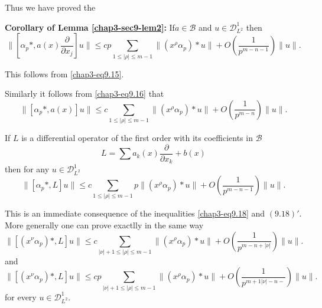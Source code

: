 Thus we have proved the 

\smallskip
\noindent
{\bf Corollary of Lemma \ref{chap3-sec9-lem2}:}
If\pageoriginale $a \in \mathscr{B}$ and $u \in \mathscr{D}^1_{L^2}$ then 
\begin{equation}
\|  [ \alpha_p *, a (x) \frac{\partial}{\partial x_j} ] u \| \le c p
\sum\limits_{1\le|\rho|\le m-1} \| (x^\rho \alpha_p) * u \| + O \left(
\frac{1}{p^{m-n-1}}\right) \| u \|. \tag{9.18} \label{chap3-eq9.18}
\end{equation} 

This follows from \eqref{chap3-eq9.15}.

Similarly it follows from  \eqref{chap3-eq9.16} that 
\begin{equation*}
\|  [ \alpha_p *, a (x)  ] u \| \le c  \sum\limits_{1\le|\rho|\le m-1}
\| (x^\rho \alpha_p) * u \| + O (\frac{1}{p^{m-n}}) \|
u\|. \tag*{$(9.18)'$}  
\end{equation*}

\begin{lemma}\label{chap3-sec9-lem3}%
If $L$ is a differential operator of the first order with its
coefficients in $\mathscr{B}$ 
\begin{equation*}
L = \sum a_k (x) \frac{\partial}{\partial x_k} + b(x)
\tag{9.19}\label{chap3-eq9.19} 
\end{equation*}
then for any $u \in  \mathscr{D}^1_{L^2}$
\begin{equation*}
\|  [ \alpha_p *, L ] u \| \le c  \sum\limits_{1\le|\rho|\le m-1} p\|
(x^\rho \alpha_p) * u \| + O ( \frac{1}{p^{m-n-1}}) \| u
\|. \tag{9.20} \label{chap3-eq9.20}
\end{equation*}

This is an immediate consequence of the inequalities \eqref{chap3-eq9.18} and
$(9.18)'$. More generally one can prove exactlly in the same way 
\begin{equation*}
\| [ ( x^\nu \alpha_p ) *, L] u \| \le c
\sum\limits_{|\nu|+1\le|\rho|\le m-1} \| (x^\rho \alpha_p) * u \| + O
\left( \frac{1}{p^{m-n+ | \nu |}}\right) \| u
\|.\tag{9.21} \label{chap3-eq9.21} 
\end{equation*}
and 
\begin{equation*}
\| [ ( x^\nu \alpha_p ) *, L] u \| \le cp
\sum\limits_{|\nu|+1\le|\rho|\le m-1} \| (x^\rho \alpha_p) * u \| + O
( \frac{1}{p^{m+  1 
    | \nu | - n -}}) \| u \|. \tag{9.22} \label{chap3-eq9.22}
\end{equation*}
for every $u \in  \mathscr{D}^1_{L^2}$.
\end{lemma}

